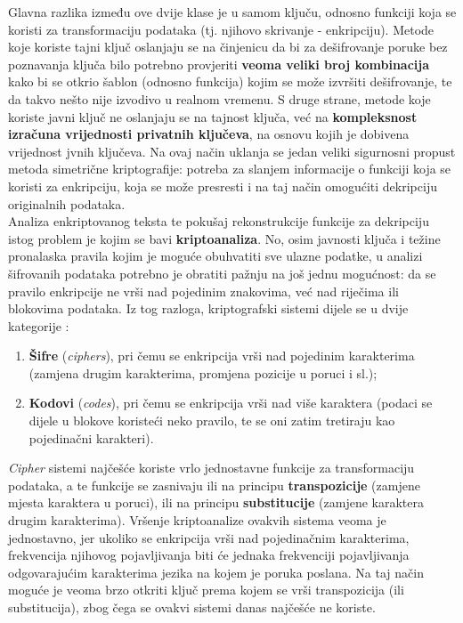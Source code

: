 \documentclass[12pt, a4paper]{article}
\begin{document}
Glavna razlika između ove dvije klase je u samom ključu, odnosno funkciji koja se koristi za transformaciju podataka (tj. njihovo skrivanje - enkripciju). Metode koje koriste tajni ključ oslanjaju se na činjenicu da bi za dešifrovanje poruke bez poznavanja ključa bilo potrebno provjeriti \textbf{veoma veliki broj kombinacija} kako bi se otkrio šablon (odnosno funkcija) kojim se može izvršiti dešifrovanje, te da takvo nešto nije izvodivo u realnom vremenu. S druge strane, metode koje koriste javni ključ ne oslanjaju se na tajnost ključa, već na \textbf{kompleksnost izračuna vrijednosti privatnih ključeva}, na osnovu kojih je dobivena vrijednost jvnih ključeva. Na ovaj način uklanja se jedan veliki sigurnosni propust metoda simetrične kriptografije: potreba za slanjem informacije o funkciji koja se koristi za enkripciju, koja se može presresti i na taj način omogućiti dekripciju originalnih podataka. \cite{cryptography} \\

Analiza enkriptovanog teksta te pokušaj rekonstrukcije funkcije za dekripciju istog problem je kojim se bavi \textbf{kriptoanaliza}. No, osim javnosti ključa i težine pronalaska pravila kojim je moguće obuhvatiti sve ulazne podatke, u analizi šifrovanih podataka potrebno je obratiti pažnju na još jednu mogućnost: da se pravilo enkripcije ne vrši nad pojedinim znakovima, već nad riječima ili blokovima podataka. Iz tog razloga, kriptografski sistemi dijele se u dvije kategorije \cite{manual}:

\begin{enumerate}

\item \textbf{Šifre} (\textit{ciphers}), pri čemu se enkripcija vrši nad pojedinim karakterima (zamjena drugim karakterima, promjena pozicije u poruci i sl.);
\item \textbf{Kodovi} (\textit{codes}), pri čemu se enkripcija vrši nad više karaktera (podaci se dijele u blokove koristeći neko pravilo, te se oni zatim tretiraju kao pojedinačni karakteri).

\end{enumerate}

\textit{Cipher} sistemi najčešće koriste vrlo jednostavne funkcije za transformaciju podataka, a te funkcije se zasnivaju ili na principu \textbf{transpozicije} (zamjene mjesta karaktera u poruci), ili na principu \textbf{substitucije} (zamjene karaktera drugim karakterima). \cite{manual} Vršenje kriptoanalize ovakvih sistema veoma je jednostavno, jer ukoliko se enkripcija vrši nad pojedinačnim karakterima, frekvencija njihovog pojavljivanja biti će jednaka frekvenciji pojavljivanja odgovarajućim karakterima jezika na kojem je poruka poslana. Na taj način moguće je veoma brzo otkriti ključ prema kojem se vrši transpozicija (ili substitucija), zbog čega se ovakvi sistemi danas najčešće ne koriste. \cite{thesis} \\
\end{document}
